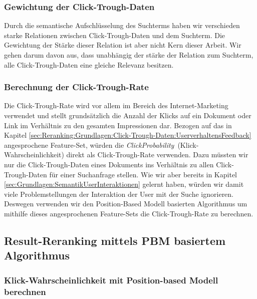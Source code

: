 \subsubsection{Gewichtung der Click-Trough-Daten}
\label{sec:Reranking:Methodik:Click-Trough-Daten:Gewichtung}

Durch die semantische Aufschlüsselung des Suchterms haben wir verschieden starke Relationen zwischen Click-Trough-Daten und dem Suchterm. Die Gewichtung der Stärke dieser Relation ist aber nicht Kern dieser Arbeit. Wir gehen darum davon aus, dass unabhängig der stärke der Relation zum Suchterm, alle Click-Trough-Daten eine gleiche Relevanz besitzen.

\subsubsection{Berechnung der Click-Trough-Rate}
\label{sec:Reranking:Methodik:Click-Trough-Daten:Gewichtung}

Die Click-Trough-Rate wird vor allem im Bereich des Internet-Marketing verwendet und stellt grundsätzlich die Anzahl der Klicks auf ein Dokument oder Link im Verhältnis zu den gesamten Impressionen dar. Bezogen auf das in Kapitel \ref{sec:Reranking:Grundlagen:Click-Trough-Daten:UserverhaltensFeedback} angesprochene Feature-Set, würden die \textit{ClickProbability}~(Klick-Wahrscheinlichkeit) direkt als Click-Trough-Rate verwenden. Dazu müssten wir nur die Click-Trough-Daten eines Dokuments ins Verhältnis zu allen Click-Trough-Daten für einer Suchanfrage stellen. Wie wir aber bereits in Kapitel \ref{sec:Grundlagen:SemantikUserInteraktionen} gelernt haben, würden wir damit viele Problemstellungen der Interaktion der User mit der Suche ignorieren. Deswegen verwenden wir den Position-Based Modell basierten Algorithmus um mithilfe dieses angesprochenen Feature-Sets die Click-Trough-Rate zu berechnen.

\subsection{Result-Reranking mittels PBM basiertem Algorithmus}
\label{sec:Reranking:Methodik:Result-RerankingPBM}

\subsubsection{Klick-Wahrscheinlichkeit mit Position-based Modell berechnen}
\label{sec:Reranking:Methodik:Result-RerankingPBM:Klick-Wahrscheinlichkeit}

